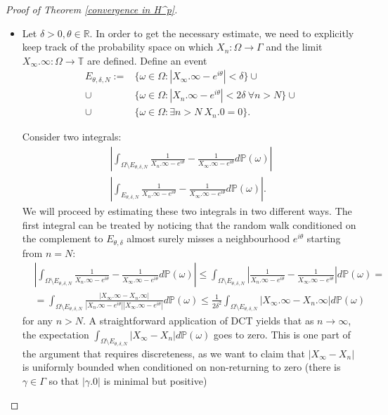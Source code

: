 \documentclass[11pt]{article}
\begin{document}
\begin{proof}[Proof of Theorem \ref{convergence in H^p}]
	\indent
	\begin{itemize}
		\item 
		
		Let $\delta > 0, \theta \in \mathbb{R}$. In order to get the necessary estimate, we need to explicitly keep track of the probability space on which $X_n : \Omega \rightarrow \Gamma$ and the limit $X_\infty.\infty: \Omega \rightarrow \mathbb{T}$ are defined. Define an event 
		\[
		\begin{aligned}
			E_{\theta, \delta, N}  := & \{ \omega \in \Omega : |X_\infty.\infty - e^{i \theta}| < \delta \} \cup \\  \cup & \{\omega \in \Omega : | X_n.\infty - e^{i \theta}| < 2 \delta \  \forall n > N\} \cup \\ \cup & \{\omega \in \Omega : \exists n > N \  X_n.0 = 0 \}.
		\end{aligned}		
		\]
		
		Consider two integrals:
		\begin{gather}
			\left| \int_{\Omega \setminus E_{\theta, \delta, N}} \frac{1}{X_n.\infty - e^{i \theta}} - \frac{1}{X_\infty.\infty - e^{i \theta}} d \mathbb{P}(\omega) \right| \\
			\left| \int_{E_{\theta, \delta, N}} \frac{1}{X_n.\infty - e^{i \theta}} - \frac{1}{X_\infty.\infty - e^{i \theta}} d \mathbb{P}(\omega) \right|.
		\end{gather}
		We will proceed by estimating these two integrals in two different ways. The first integral can be treated by noticing that the random walk conditioned on the complement to $E_{\theta, \delta}$ almost surely misses a neighbourhood $e^{i \theta}$ starting from $n = N$:
		\[
		\begin{aligned}
			& \left| \int_{\Omega \setminus E_{\theta, \delta, N}} \frac{1}{X_n.\infty - e^{i \theta}} - \frac{1}{X_\infty.\infty - e^{i \theta}} d \mathbb{P}(\omega) \right| \le
			\int_{\Omega \setminus E_{\theta, \delta, N}} \left| \frac{1}{X_n.\infty - e^{i \theta}} - \frac{1}{X_\infty.\infty - e^{i \theta}} \right| d \mathbb{P}(\omega) = \\ 
			& = \int_{\Omega \setminus E_{\theta, \delta, N}} \frac{|X_\infty.\infty - X_n.\infty|}{|X_n.\infty - e^{i \theta}| |X_\infty.\infty - e^{i \theta}|} d \mathbb{P}(\omega) \le \frac{1}{2 \delta^2} \int_{\Omega \setminus E_{\theta, \delta, N}} |X_\infty.\infty - X_n.\infty| d \mathbb{P}(\omega)
		\end{aligned}
		\]
		for any $n > N$. A straightforward application of DCT yields that as $n \rightarrow \infty$, the expectation $\int_{\Omega \setminus E_{\theta, \delta, N}} |X_\infty - X_n| d \mathbb{P}(\omega)$ goes to zero. This is one part of the argument that requires discreteness, as we want to claim that $|X_\infty - X_n|$ is uniformly bounded when conditioned on non-returning to zero (there is $\gamma \in \Gamma$ so that $|\gamma.0|$ is minimal but positive)
		

\end{itemize}
\end{proof}
\end{document}
